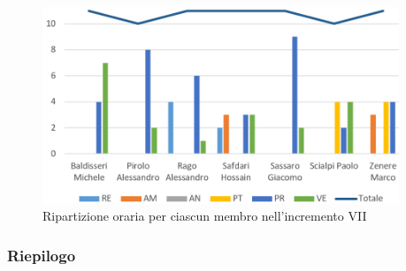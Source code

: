 \begin{figure}[!htb]   
    \centering
    \includegraphics[width=0.95\textwidth]{Images/prev7}
	\caption{Ripartizione oraria per ciascun membro nell'incremento VII}
\end{figure}

\subsubsection{Riepilogo}

